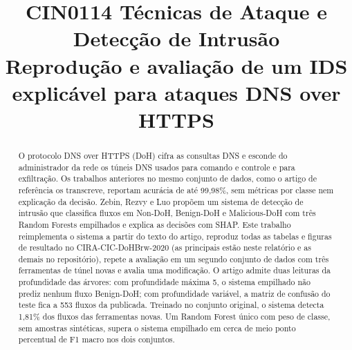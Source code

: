 \documentclass[conference]{IEEEtran}
\begin{document}
\title{CIN0114 Técnicas de Ataque e Detecção de Intrusão\\
Reprodução e avaliação de um IDS explicável para ataques DNS over HTTPS}

\author{
\and
{}
\and
{}
}

\maketitle

\begin{abstract}
O protocolo DNS over HTTPS (DoH) cifra as consultas DNS e esconde do administrador da rede os túneis DNS usados para comando e controle e para exfiltração. Os trabalhos anteriores no mesmo conjunto de dados, como o artigo de referência os transcreve, reportam acurácia de até 99,98\%, sem métricas por classe nem explicação da decisão. Zebin, Rezvy e Luo propõem um sistema de detecção de intrusão que classifica fluxos em Non-DoH, Benign-DoH e Malicious-DoH com três Random Forests empilhados e explica as decisões com SHAP. Este trabalho reimplementa o sistema a partir do texto do artigo, reproduz todas as tabelas e figuras de resultado no CIRA-CIC-DoHBrw-2020 (as principais estão neste relatório e as demais no repositório), repete a avaliação em um segundo conjunto de dados com três ferramentas de túnel novas e avalia uma modificação. O artigo admite duas leituras da profundidade das árvores: com profundidade máxima 5, o sistema empilhado não prediz nenhum fluxo Benign-DoH; com profundidade variável, a matriz de confusão do teste fica a 553 fluxos da publicada. Treinado no conjunto original, o sistema detecta 1,81\% dos fluxos das ferramentas novas. Um Random Forest único com peso de classe, sem amostras sintéticas, supera o sistema empilhado em cerca de meio ponto percentual de F1 macro nos dois conjuntos.
\end{abstract}
\end{document}

